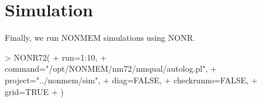 \section{Simulation}
Finally, we run NONMEM simulations using NONR.
\begin{Schunk}
\begin{Sinput}
> NONR72(
+ 	run=1:10,
+ 	command="/opt/NONMEM/nm72/nmqual/autolog.pl",
+ 	project="../nonmem/sim",
+ 	diag=FALSE,
+ 	checkrunno=FALSE,
+ 	grid=TRUE
+ )
\end{Sinput}
\end{Schunk}

